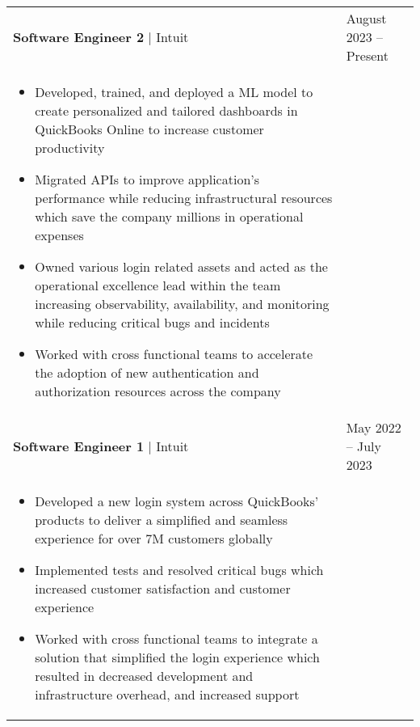 \documentclass[11pt]{article}
\newenvironment{compactList}
{
  \begin{itemize}
    \setlength{\itemsep}{0pt}
    \setlength{\parskip}{0pt}
}
{\end{itemize}}
\begin{document}
\begin{tabularx}{\textwidth\setlength{\extrarowheight}{5pt}}
  {
    >{\hsize=1.5\hsize\raggedright\arraybackslash}X
    >{\hsize=0.5\hsize\raggedleft\arraybackslash}X
  }
  \textbf{Software Engineer 2} $\vert$ Intuit                            & August 2023 – Present     \\
  \multicolumn{2}{>{\hsize=\dimexpr2\hsize+2\tabcolsep+\arrayrulewidth\relax}X}
  {
    \begin{minipage}{0.85\paperwidth}
      \begin{compactList}
        \item Developed, trained, and deployed a ML model to create personalized and tailored dashboards in QuickBooks Online to increase customer productivity
        \item Migrated APIs to improve application's performance while reducing infrastructural resources which save the company millions in operational expenses
        \item Owned various login related assets and acted as the operational excellence lead within the team increasing observability, availability, and monitoring while reducing critical bugs and incidents
        \item Worked with cross functional teams to accelerate the adoption of new authentication and authorization resources across the company
      \end{compactList}
    \end{minipage}
  }
  \\
  \textbf{Software Engineer 1} $\vert$ Intuit                            & May 2022 – July 2023     \\
  \multicolumn{2}{>{\hsize=\dimexpr2\hsize+2\tabcolsep+\arrayrulewidth\relax}X}
  {
    \begin{minipage}{0.85\paperwidth}
      \begin{compactList}
        \item Developed a new login system across QuickBooks' products to deliver a simplified and seamless experience for over 7M customers globally
        \item Implemented tests and resolved critical bugs which increased customer satisfaction and customer experience
        \item Worked with cross functional teams to integrate a solution that simplified the login experience which resulted in decreased development and infrastructure overhead, and increased support
      \end{compactList}

\end{minipage}}
\end{tabularx}
\end{document}

